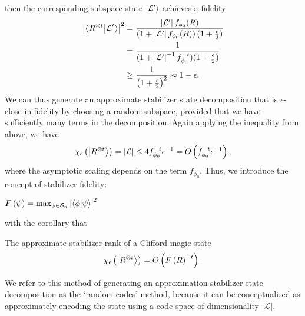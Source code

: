 then the corresponding subspace state $\ket{\mathcal{L'}}$ achieves a fidelity
\begin{align}
\left|\braket{R^{\otimes t}}{\mathcal{L'}}\right|^{2}&=\frac{\left|\mathcal{L'}\right|f_{\phi_{0}}(R)}{\left(1+\left|\mathcal{L'}\right|f_{\phi_{0}}(R)\right)(1+\frac{\epsilon}{2})}\nonumber \\
&= \frac{1}{(1+\left|\mathcal{L'}\right|^{-1}f_{\phi_{0}}^{-t})(1+\frac{\epsilon}{2})} \nonumber \\
&\geq \frac{1}{\left(1+\frac{\epsilon}{2}\right)^{2}} \approx 1 - \epsilon.
\label{eq:clifford_fidelity}
\end{align}
We can thus generate an approximate stabilizer state decomposition that is $\epsilon$-close in fidelity by choosing a random subspace, provided that we have sufficiently many terms in the decomposition. Again applying the inequality from above, we have
\begin{equation}
\chi_{\epsilon}\left(\ket{R^{\otimes t}}\right) = \left|\mathcal{L}\right| \leq 4 f_{\phi_{0}}^{-t}\epsilon^{-1}=O\left(f_{\phi_{0}}^{-t}\epsilon^{-1}\right),
\label{eq:clifford_approx_rank}
\end{equation}
where the asymptotic scaling depends on the term $f_{\phi_{0}}$. Thus, we introduce the concept of stabilizer fidelity:
\begin{defn}
$F\left(\psi\right) = \max_{\phi \in\mathcal{S}_{n}} \left|\braket{\phi}{\psi}\right|^{2}$
\label{def:stabilizer_fidelity}
\end{defn}
with the corollary that
\begin{cor}
The approximate stabilizer rank of a Clifford magic state 
\[\chi_{\epsilon}\left(\ket{R^{\otimes t}}\right) = O\left(F\left(R\right)^{-t}\right).\]
\end{cor}
We refer to this method of generating an approximation stabilizer state decomposition as the `random codes' method, because it can be conceptualised as approximately encoding the state using a code-space of dimensionality $\left|\mathcal{L}\right|$.
